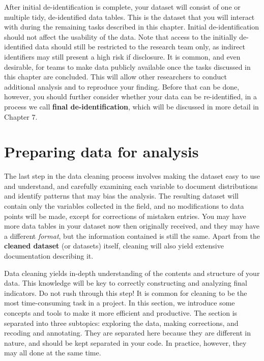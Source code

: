 After initial de-identification is complete,
your dataset will consist of one or multiple tidy,
de-identified data tables.
This is the dataset that you will interact with
during the remaining tasks described in this chapter.
Initial de-identification should not affect the usability of the data.
Note that access to the initially de-identified data
should still be restricted to the research team only,
as indirect identifiers may still present a high risk if disclosure.
It is common, and even desirable, for teams to make data publicly available
once the tasks discussed in this chapter are concluded.
This will allow other researchers to conduct additional analysis and to reproduce your finding.
Before that can be done, however,
you should further consider whether your data can be re-identified,
in a process we call \textbf{final de-identification},
which will be discussed in more detail in Chapter 7.


\section{Preparing data for analysis}

The last step in the data cleaning process involves
making the dataset easy to use and understand, and
carefully examining each variable to document distributions
and identify patterns that may bias the analysis.
The resulting dataset will contain only the variables collected in the field, and
no modifications to data points will be made,
except for corrections of mistaken entries.
You may have more data tables in your dataset now then originally received,
and they may have a different \textit{format},
but the information contained is still the same.
Apart from the \textbf{cleaned dataset} (or datasets) itself,
cleaning will also yield extensive documentation describing it.

Data cleaning yields in-depth understanding of the contents and structure of your data.
This knowledge will be key to correctly constructing and analyzing final indicators.
Do not rush through this step!
It is common for cleaning to be the most time-consuming task in a project.
In this section, we introduce some concepts and tools to make it more efficient and productive.
The section is separated into three subtopics:
exploring the data, making corrections, and recoding and annotating.
They are separated here because they are different in nature,
and should be kept separated in your code.
In practice, however, they may all done at the same time.


